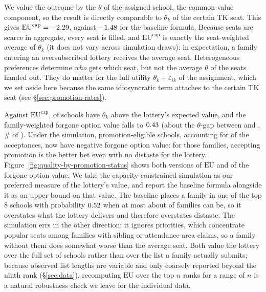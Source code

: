 \documentclass{article}
\begin{document}
We value the outcome by the $\theta$ of the assigned school, the common-value component, so the result is directly comparable to $\theta_k$ of the certain TK seat. This gives $\mathrm{EU}^{\text{cap}} = -2.29$, against $-1.48$ for the baseline formula. Because seats are scarce in aggregate, every seat is filled, and $\mathrm{EU}^{\text{cap}}$ is exactly the seat-weighted average of $\theta_k$ (it does not vary across simulation draws): in expectation, a family entering an oversubscribed lottery receives the average seat. Heterogeneous preferences determine \emph{who} gets which seat, but not the average $\theta$ of the seats handed out. They do matter for the full utility $\theta_k + \varepsilon_{ik}$ of the assignment, which we set aside here because the same idiosyncratic term attaches to the certain TK seat (see \S\ref{sec:promotion-rates}).

Against $\mathrm{EU}^{\text{cap}}$, \numAboveEUcap{} of \numSchools{} schools have $\theta_k$ above the lottery's expected value, and the family-weighted forgone option value falls to $0.43$ (about the $\theta$-gap between \numTopSchool{} and \numFOVcapSchool, \#\numFOVcapRank{} of \numSchools). Under the simulation, \numNegFOVcapSchools{} promotion-eligible schools, accounting for \numNegFOVcapFamilies{} of the \numPromoted{} acceptances, now have negative forgone option value: for those families, accepting promotion is the better bet even with no distaste for the lottery. Figure~\ref{fig:quality-by-promotion-status} shows both versions of $\mathrm{EU}$ and of the forgone option value. We take the capacity-constrained simulation as our preferred measure of the lottery's value, and report the baseline formula alongside it as an upper bound on that value. The baseline places a family in one of the top 8 schools with probability $0.52$ when at most about \numSeatsTopEightShare{} of families can be, so it overstates what the lottery delivers and therefore overstates distaste. The simulation errs in the other direction: it ignores priorities, which concentrate popular seats among families with sibling or attendance-area claims, so a family without them does somewhat worse than the average seat. Both value the lottery over the full set of schools rather than over the list a family actually submits; because observed list lengths are variable and only coarsely reported beyond the ninth rank (\S\ref{sec:data}), recomputing $\mathrm{EU}$ over the top $n$ ranks for a range of $n$ is a natural robustness check we leave for the individual data.
\end{document}
